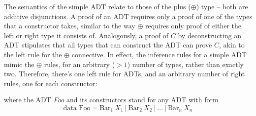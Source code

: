 \documentclass{llncs}
\newcommand{\te}[1]{\textrm{\emph{#1}}}
\begin{document}
The semantics of the simple ADT relate to those of the plus ($\oplus$) type --
both are additive disjunctions.  A proof of an ADT requires only a proof of one
of the types that a constructor takes, similar to the way $\oplus$ requires only
proof of either the left or right type it consists of. Analogously, a proof of
$C$ by deconstructing an ADT stipulates that all types that can construct the
ADT can prove $C$, akin to the left rule for the $\oplus$ connective. In effect,
the inference rules for a simple ADT mimic the $\oplus$ rules, for an
arbitrary ($> 1$) number of types, rather than exactly two. Therefore, there's one
left rule for ADTs, and an arbitrary number of right rules, one for each
constructor:
where the ADT \emph{Foo} and its constructors stand for any ADT with form
\[
    \textrm{data Foo} = \textrm{Bar}_1\ X_1\ \vert\ \textrm{Bar}_2\ X_2\ \vert\
\dots\ \vert\ \textrm{Bar}_n\ X_n
\]
\end{document}
